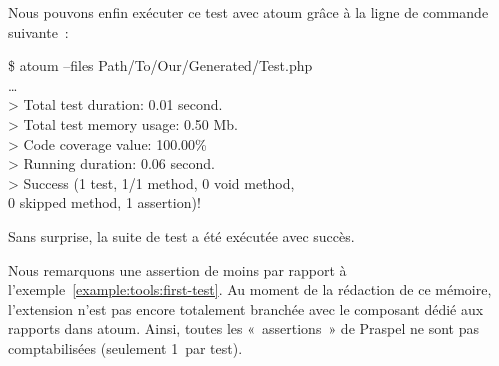\begin{example}
\noindent Nous pouvons enfin exécuter ce test avec atoum grâce à la ligne de
commande suivante~:
%
\begin{pre}
\$ atoum --files Path/To/Our/Generated/Test.php \\
… \\
> Total test duration: 0.01 second. \\
> Total test memory usage: 0.50 Mb. \\
> Code coverage value: 100.00\% \\
> Running duration: 0.06 second. \\
> Success (1 test, 1/1 method, 0 void method, \\
           0 skipped method, 1 assertion)!
\end{pre}
%
Sans surprise, la suite de test a été exécutée avec succès.

Nous remarquons une assertion de moins par rapport à
l'exemple~\ref{example:tools:first-test}.  Au moment de la rédaction de ce
mémoire, l'extension n'est pas encore totalement branchée avec le composant
dédié aux rapports dans atoum. Ainsi, toutes les «~assertions~» de Praspel ne
sont pas comptabilisées (seulement 1~par test).

\end{example}
